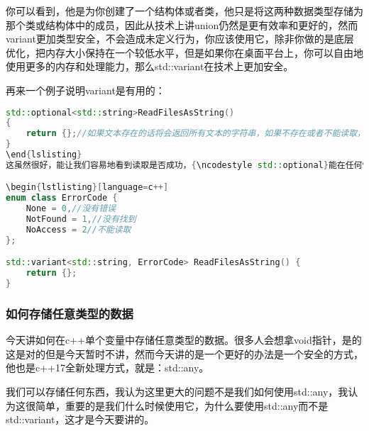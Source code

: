 你可以看到，他是为你创建了一个结构体或者类，他只是将这两种数据类型存储为那个类或结构体中的成员，因此从技术上讲union仍然是更有效率和更好的，然而{\ncodestyle variant}更加类型安全，不会造成未定义行为，你应该使用它，除非你做的是底层优化，把内存大小保持在一个较低水平，但是如果你在桌面平台上，你可以自由地使用更多的内存和处理能力，那么{\ncodestyle std::variant}在技术上更加安全。

再来一个例子说明{\ncodestyle variant}是有用的：

\begin{lstlisting}[language=c++]
std::optional<std::string>ReadFilesAsString()
{
    return {};//如果文本存在的话将会返回所有文本的字符串，如果不存在或者不能读取，则返回optional{}
}
\end{lslisting}
这虽然很好，能让我们容易地看到读取是否成功，{\ncodestyle std::optional}能在任何情况下允许我们有一些不存在的可选数据，在今天的例子中，我们要知道哪里出了问题，而不仅仅说数据不存在，所以我们不用{\ncodestyle optiona}l而是{\ncodestyle variant}，如果我们成功的获取了数据，我们可以用字符串作为值，如果不成功，我们可以设置一些错误代码，我们可以把它编码成一个整数。比返回一个布尔值更详细一些，给我们更多信息而返回一个布尔值来判断是否有结果这种情况，就是之前optional的方式了。

\begin{lstlisting}[language=c++]
enum class ErrorCode {
    None = 0,//没有错误
    NotFound = 1,//没有找到
    NoAccess = 2//不能读取
};

std::variant<std::string, ErrorCode> ReadFilesAsString() {
    return {};
}
\end{lstlisting}


\subsubsection{如何存储任意类型的数据}


今天讲如何在c++单个变量中存储任意类型的数据。很多人会想拿{\ncodestyle void}指针，是的这是对的但是今天暂时不讲，然而今天讲的是一个更好的办法是一个安全的方式，他也是c++17全新处理方式，就是：{\ncodestyle std::any}。

我们可以存储任何东西，我认为这里更大的问题不是我们如何使用{\ncodestyle std::any}，我认为这很简单，重要的是我们什么时候使用它，为什么要使用{\ncodestyle std::any}而不是{\ncodestyle std::variant}，这才是今天要讲的。

